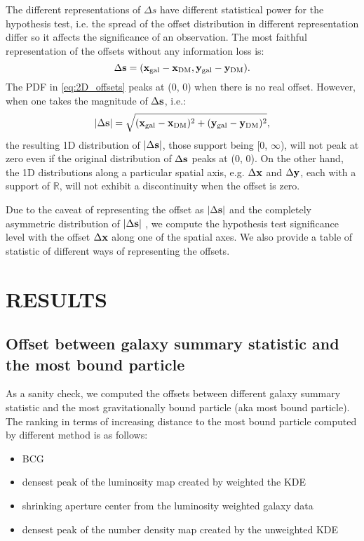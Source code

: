 The different representations of $\Delta s$ have different statistical power
for the hypothesis test, i.e. the spread of the offset distribution in
different representation differ so
it affects the significance of an observation. 
The most faithful representation of the offsets without any information loss
is:
\begin{equation}
	\Delta {\bf s} = ({\bf x}_{\rm gal} - {\bf x}_{\rm DM}, 
	{\bf y}_{\rm gal} - {\bf y}_{\rm DM} ).
	\label{eq:2D_offsets}
\end{equation}
The PDF in \ref{eq:2D_offsets} peaks at (0, 0) when there is no real offset.
However, when one takes the magnitude of $\Delta {\bf s}$, i.e.:
\begin{equation}
	|\Delta {\bf s}| = \sqrt{({\bf x}_{\rm gal} - {\bf x}_{\rm DM})^2 + 
	({\bf y}_{\rm gal} - {\bf y}_{\rm DM})^2},
	\label{eq:magnitude_offsets}
\end{equation}
the resulting 1D distribution of $|\Delta {\bf s}|$, 
those support being [0, $\infty$),
will not peak at zero even if the original
distribution of $\Delta {\bf s}$ peaks at (0, 0). On the other hand, 
the 1D distributions along a particular spatial axis, e.g. $\Delta {\bf x}$ and $\Delta {\bf y}$,
each with a support of $\mathbb{R}$, will not exhibit a discontinuity when
the offset is zero. 

Due to the caveat of representing the offset as $|\Delta {\bf s}|$
and the completely asymmetric distribution of $|\Delta {\bf s}|$
, we compute the hypothesis test significance level with the 
 offset $\Delta {\bf x}$ along one of the spatial axes.
We also provide a table of statistic of different ways of representing the
offsets.

\section{RESULTS} 
\label{sec:results}

\subsection{Offset between galaxy summary statistic and the most bound particle}

As a sanity check, we computed the offsets between different galaxy summary
statistic and the most gravitationally bound particle (aka most bound particle). 
The ranking in terms of increasing distance 
to the most bound particle computed by different method is as follows:
\begin{itemize}
	\item BCG 
	\item densest peak of the luminosity map created by weighted the KDE 
		\item shrinking aperture center from the luminosity weighted galaxy data
		\item densest peak of the number density map created by the unweighted KDE 
\end{itemize}

